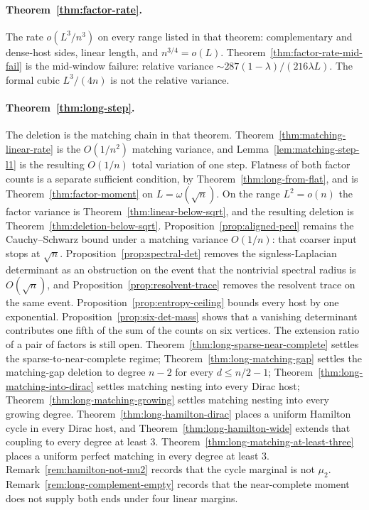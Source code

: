 \documentclass[11pt]{article}
\begin{document}
\paragraph{Theorem~\ref{thm:factor-rate}.}
The rate \(o(L^3/n^3)\) on every range listed in that theorem: complementary
and dense-host sides, linear length, and \(n^{3/4}=o(L)\).
Theorem~\ref{thm:factor-rate-mid-fail} is the mid-window failure: relative
variance \(\sim 287(1-\lambda)/(216\lambda L)\).
The formal cubic \(L^3/(4n)\) is not the relative variance.

\paragraph{Theorem~\ref{thm:long-step}.}
The deletion is the matching chain in that theorem.
Theorem~\ref{thm:matching-linear-rate} is the \(O(1/n^2)\) matching variance,
and Lemma~\ref{lem:matching-step-l1} is the resulting \(O(1/n)\) total variation
of one step.
Flatness of both factor counts is a separate sufficient condition, by
Theorem~\ref{thm:long-from-flat}, and is Theorem~\ref{thm:factor-moment} on
\(L=\omega(\sqrt{n})\).
On the range \(L^2=o(n)\) the factor variance is
Theorem~\ref{thm:linear-below-sqrt}, and the resulting deletion is
Theorem~\ref{thm:deletion-below-sqrt}.
Proposition~\ref{prop:aligned-peel} remains the Cauchy--Schwarz bound under a
matching variance \(O(1/n)\): that coarser input stops at \(\sqrt{n}\).
Proposition~\ref{prop:spectral-det} removes the signless-Laplacian determinant
as an obstruction on the event that the nontrivial spectral radius is
\(O(\sqrt{n})\), and Proposition~\ref{prop:resolvent-trace} removes the
resolvent trace on the same event.
Proposition~\ref{prop:entropy-ceiling} bounds every host by one exponential.
Proposition~\ref{prop:six-det-mass} shows that a vanishing determinant
contributes one fifth of the sum of the counts on six vertices.
The extension ratio of a pair of factors is still open.
Theorem~\ref{thm:long-sparse-near-complete} settles the sparse-to-near-complete
regime; Theorem~\ref{thm:long-matching-gap} settles the matching-gap deletion to
degree \(n-2\) for every \(d\le n/2-1\); Theorem~\ref{thm:long-matching-into-dirac}
settles matching nesting into every Dirac host; Theorem~\ref{thm:long-matching-growing}
settles matching nesting into every growing degree.
Theorem~\ref{thm:long-hamilton-dirac} places a uniform Hamilton cycle in every
Dirac host, and Theorem~\ref{thm:long-hamilton-wide} extends that coupling to
every degree at least \(3\).
Theorem~\ref{thm:long-matching-at-least-three} places a uniform perfect matching
in every degree at least \(3\).
Remark~\ref{rem:hamilton-not-mu2} records that the cycle marginal is not \(\mu_2\).
Remark~\ref{rem:long-complement-empty} records that the
near-complete moment does not supply both ends under four linear margins.
\end{document}
